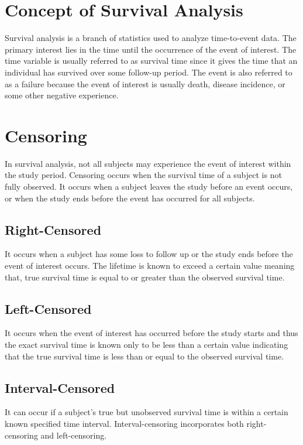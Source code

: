 \documentclass[doublespacing,12pt]{report}
\begin{document}
\section{Concept of Survival Analysis}

Survival analysis is a branch of statistics used to analyze time-to-event data. The primary interest lies in the time until the occurrence of the event of interest.  The time variable is usually referred to as survival time since it gives the time that an individual has survived over some follow-up period. The event is also referred to as a failure because the event of interest is usually death, disease incidence, or some other negative experience. 

\section{Censoring}

In survival analysis, not all subjects may experience the event of interest within the study period. Censoring occurs when the survival time of a subject is not fully observed. It occurs when a subject leaves the study before an event occurs, or when the study ends before the event has occurred for all subjects.


\subsection{Right-Censored}

It occurs when a subject has some loss to follow up or the study ends before the event of interest occurs. The lifetime is known to exceed a certain value meaning that, true survival time is equal to or greater than the observed survival time.

\subsection{Left-Censored}

It occurs when the event of interest has occurred before the study starts and thus the exact survival time is known only to be less than a certain value indicating that the true survival time is less than or equal to the observed survival time.

\subsection{Interval-Censored}

It can occur if a subject’s true but unobserved survival time is within a certain known specified time interval. Interval-censoring incorporates both right-censoring and left-censoring. 
\end{document}

